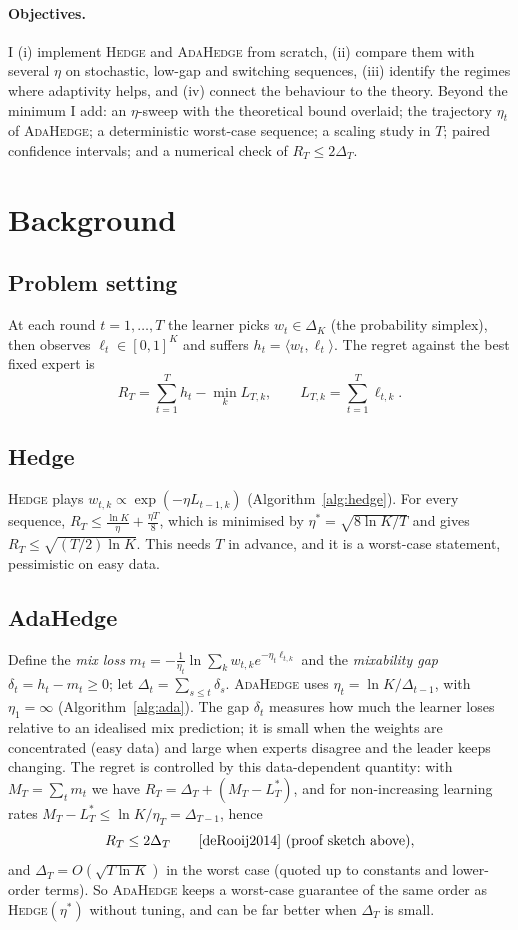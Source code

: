 \documentclass[11pt,a4paper]{article}
\newcommand{\Hedge}{\textsc{Hedge}}
\newcommand{\Ada}{\textsc{AdaHedge}}
\newcommand{\lnK}{\ln K}
\begin{document}
\paragraph{Objectives.}
I (i) implement \Hedge{} and \Ada{} from scratch, (ii) compare them with several $\eta$ on stochastic, low-gap and switching sequences, (iii) identify the regimes where
adaptivity helps, and (iv) connect the behaviour to the theory.
Beyond the minimum I add: an $\eta$-sweep with the theoretical bound overlaid; the trajectory $\eta_t$ of \Ada{}; a deterministic worst-case sequence; a scaling study in $T$;
paired confidence intervals; and a numerical check of $R_T\le2\Delta_T$.

\section{Background}\label{sec:background}
\subsection{Problem setting}
At each round $t=1,\dots,T$ the learner picks $w_t\in\Delta_K$ (the probability simplex), then observes $\ell_t\in[0,1]^K$ and
suffers $h_t=\langle w_t,\ell_t\rangle$. The regret against the best fixed expert is
\[
R_T=\sum_{t=1}^T h_t-\min_k L_{T,k},\qquad L_{T,k}=\sum_{t=1}^T \ell_{t,k}.
\]

\subsection{Hedge}
\Hedge{} plays $w_{t,k}\propto \exp(-\eta L_{t-1,k})$ (Algorithm~\ref{alg:hedge}). For every sequence, $R_T\le \frac{\lnK}{\eta}+\frac{\eta T}{8}$, which is minimised by
$\eta^*=\sqrt{8\lnK/T}$ and gives $R_T\le\sqrt{(T/2)\lnK}$. This needs $T$ in advance, and it is a worst-case statement, pessimistic on easy data.

\subsection{AdaHedge}
Define the \emph{mix loss} $m_t=-\frac1{\eta_t}\ln\sum_k w_{t,k}e^{-\eta_t\ell_{t,k}}$ and the \emph{mixability gap}
$\delta_t=h_t-m_t\ge0$; let $\Delta_t=\sum_{s\le t}\delta_s$. \Ada{} uses $\eta_t=\lnK/\Delta_{t-1}$, with $\eta_1=\infty$ (Algorithm~\ref{alg:ada}).
The gap $\delta_t$ measures how much the learner loses relative to an idealised mix prediction; it is small when the weights are concentrated
(easy data) and large when experts disagree and the leader keeps changing.
The regret is controlled by this data-dependent quantity: with $M_T=\sum_t m_t$ we have $R_T=\Delta_T+(M_T-L^*_T)$, and for non-increasing learning rates $M_T-L^*_T\le\lnK/\eta_T=\Delta_{T-1}$, hence
\begin{equation}\label{eq:bound}
R_T\le 2\Delta_T \qquad\text{\cite{deRooij2014} (proof sketch above)},
\end{equation}
and $\Delta_T=O(\sqrt{T\lnK})$ in the worst case \cite{vanErven2011,deRooij2014} (quoted up to constants and lower-order terms). So \Ada{} keeps a worst-case
guarantee of the same order as \Hedge{}$(\eta^*)$ without tuning, and can be far better when $\Delta_T$ is small.
\end{document}
